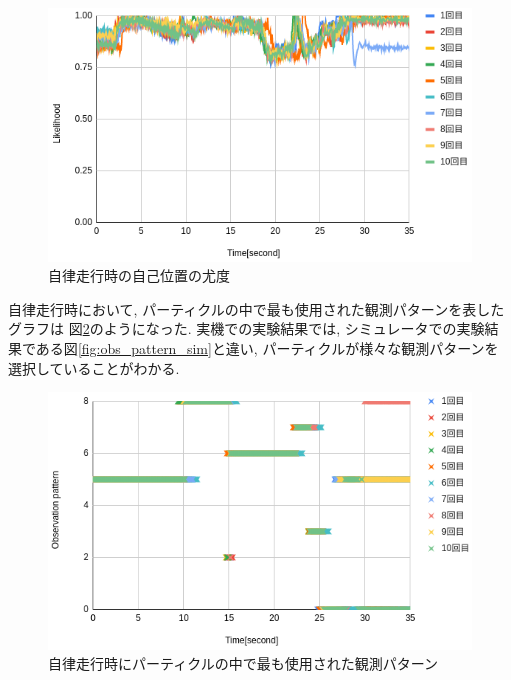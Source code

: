 \begin{figure}[H]
  \begin{center}
    \includegraphics[width=0.98\linewidth]{figs/real_likelihood_after.png}
    \caption{自律走行時の自己位置の尤度}
    \label{fig:sim_world}
  \end{center}
\end{figure}

自律走行時において, パーティクルの中で最も使用された観測パターンを表したグラフは
図\ref{fig:obs_pattern_sim_real}のようになった. 
実機での実験結果では, シミュレータでの実験結果である図\ref{fig:obs_pattern_sim}と違い, 
パーティクルが様々な観測パターンを選択していることがわかる. 

\begin{figure}[H]
  \begin{center}
    \includegraphics[width=0.98\linewidth]{figs/real_imp_ob_pattern.png}
    \caption{自律走行時にパーティクルの中で最も使用された観測パターン}
    \label{fig:obs_pattern_sim_real}
  \end{center}
\end{figure}

